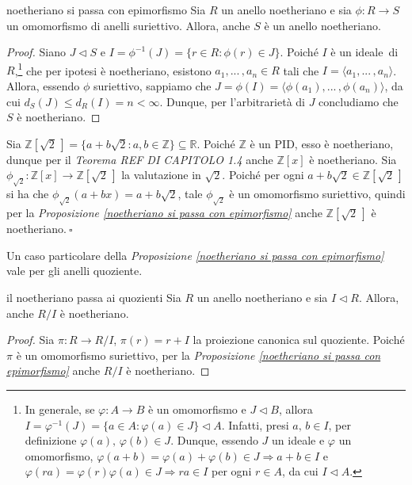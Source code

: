 \begin{prop}[1.6.4]{noetheriano si passa con epimorfismo}
  Sia $R$ un anello noetheriano e sia $\phi\colon R\to S$ un omomorfismo di anelli suriettivo. Allora, anche $S$ è un anello noetheriano.
\end{prop}
\vspace{-4mm}
\begin{proof} 
  Siano $J\lhd S$ e $I=\phi^{-1}(J)=\{r\in R : \phi(r)\in J\}.$ Poiché $I$ è un ideale~di~$R$,\footnote{In generale, 
  se $\varphi \colon A\to B$ è un omomorfismo e $J\lhd B$, allora $I=\varphi^{-1}(J)=\{a\in A: \varphi(a)\in J\}\lhd A$. 
  Infatti, presi $a,\, b\in I$, per definizione $\varphi(a),\,\varphi(b)\in J$. Dunque, essendo $J$ un ideale e $\varphi$ un omomorfismo, 
  $\varphi(a+b)=\varphi(a)+\varphi(b)\in J\Rightarrow a+b\in I$ e $\varphi(ra)=\varphi(r)\varphi(a)\in J\Rightarrow ra\in I$ 
  per ogni $r\in A$, da cui $I\lhd A$.} che per ipotesi è noetheriano, esistono $a_1,...\,,a_n \in R$ tali che $I=\langle a_1,...\,,a_n \rangle$. 
  Allora, essendo $\phi$ suriettivo, sappiamo che $J=\phi(I)=\langle \phi(a_1),...\,,\phi(a_n) \rangle$, da cui $d_S(J)\leq d_R(I)=n<\infty$. 
  Dunque, per l'arbitrarietà di $J$ concludiamo che $S$ è noetheriano. 
\end{proof}

\begin{exm} 
  Sia $\mathbb{Z}[\sqrt{2}\,]=\{a+b\sqrt{2} : a,b\in \mathbb{Z}\}\subseteq \mathbb{R}$. 
  Poiché $\mathbb{Z}$ è un PID, esso è noetheriano, dunque per il \emph{Teorema REF DI CAPITOLO 1.4} anche $\mathbb{Z}[x]$ è noetheriano. 
  Sia $\phi_{\sqrt{2}}\colon \mathbb{Z}[x]\to \mathbb{Z}[\sqrt{2}\,]$ la valutazione in $\sqrt{2}$. 
  Poiché per ogni $a+b\sqrt{2}\in \mathbb{Z}[\sqrt{2}\,]$ si ha che $\phi_{\sqrt{2}}(a+bx)=a+b\sqrt{2}$, 
  tale $\phi_{\sqrt{2}}$ è un omomorfismo suriettivo, quindi per la \emph{Proposizione \ref{noetheriano si passa con epimorfismo}} 
  anche $\mathbb{Z}[\sqrt{2}\,]$ è noetheriano$. \ \square$
\end{exm}

\noindent Un caso particolare della \emph{Proposizione \ref{noetheriano si passa con epimorfismo}} vale per gli anelli quoziente.

\begin{cor}[]{il noetheriano passa ai quozienti}
  Sia $R$ un anello noetheriano e sia $I\lhd R$. Allora, anche $R/I$ è noetheriano.
\end{cor}
\vspace{-4mm}
\begin{proof}
  Sia $\pi\colon R\to R/I$, $\pi(r)=r+I$ la proiezione canonica sul quoziente. 
  Poiché $\pi$ è un omomorfismo suriettivo, per la \emph{Proposizione \ref{noetheriano si passa con epimorfismo}} 
  anche $R/I$ è noetheriano.
\end{proof}

